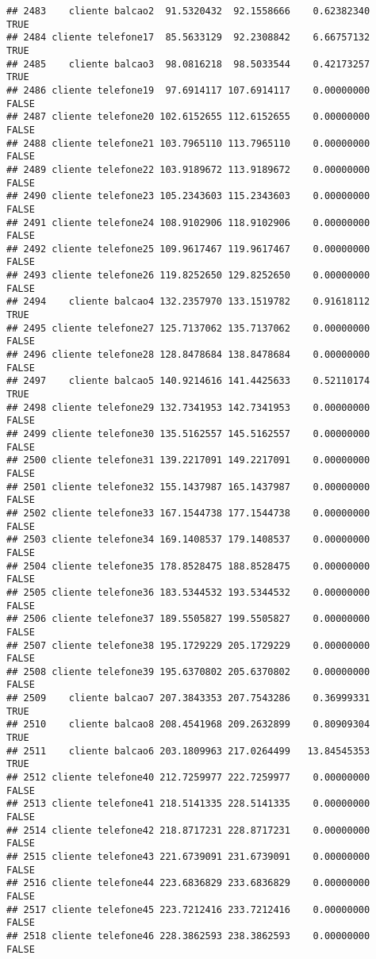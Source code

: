 \documentclass[
]{article}
\begin{document}
\begin{verbatim}
## 2483    cliente balcao2  91.5320432  92.1558666    0.62382340     TRUE
## 2484 cliente telefone17  85.5633129  92.2308842    6.66757132     TRUE
## 2485    cliente balcao3  98.0816218  98.5033544    0.42173257     TRUE
## 2486 cliente telefone19  97.6914117 107.6914117    0.00000000    FALSE
## 2487 cliente telefone20 102.6152655 112.6152655    0.00000000    FALSE
## 2488 cliente telefone21 103.7965110 113.7965110    0.00000000    FALSE
## 2489 cliente telefone22 103.9189672 113.9189672    0.00000000    FALSE
## 2490 cliente telefone23 105.2343603 115.2343603    0.00000000    FALSE
## 2491 cliente telefone24 108.9102906 118.9102906    0.00000000    FALSE
## 2492 cliente telefone25 109.9617467 119.9617467    0.00000000    FALSE
## 2493 cliente telefone26 119.8252650 129.8252650    0.00000000    FALSE
## 2494    cliente balcao4 132.2357970 133.1519782    0.91618112     TRUE
## 2495 cliente telefone27 125.7137062 135.7137062    0.00000000    FALSE
## 2496 cliente telefone28 128.8478684 138.8478684    0.00000000    FALSE
## 2497    cliente balcao5 140.9214616 141.4425633    0.52110174     TRUE
## 2498 cliente telefone29 132.7341953 142.7341953    0.00000000    FALSE
## 2499 cliente telefone30 135.5162557 145.5162557    0.00000000    FALSE
## 2500 cliente telefone31 139.2217091 149.2217091    0.00000000    FALSE
## 2501 cliente telefone32 155.1437987 165.1437987    0.00000000    FALSE
## 2502 cliente telefone33 167.1544738 177.1544738    0.00000000    FALSE
## 2503 cliente telefone34 169.1408537 179.1408537    0.00000000    FALSE
## 2504 cliente telefone35 178.8528475 188.8528475    0.00000000    FALSE
## 2505 cliente telefone36 183.5344532 193.5344532    0.00000000    FALSE
## 2506 cliente telefone37 189.5505827 199.5505827    0.00000000    FALSE
## 2507 cliente telefone38 195.1729229 205.1729229    0.00000000    FALSE
## 2508 cliente telefone39 195.6370802 205.6370802    0.00000000    FALSE
## 2509    cliente balcao7 207.3843353 207.7543286    0.36999331     TRUE
## 2510    cliente balcao8 208.4541968 209.2632899    0.80909304     TRUE
## 2511    cliente balcao6 203.1809963 217.0264499   13.84545353     TRUE
## 2512 cliente telefone40 212.7259977 222.7259977    0.00000000    FALSE
## 2513 cliente telefone41 218.5141335 228.5141335    0.00000000    FALSE
## 2514 cliente telefone42 218.8717231 228.8717231    0.00000000    FALSE
## 2515 cliente telefone43 221.6739091 231.6739091    0.00000000    FALSE
## 2516 cliente telefone44 223.6836829 233.6836829    0.00000000    FALSE
## 2517 cliente telefone45 223.7212416 233.7212416    0.00000000    FALSE
## 2518 cliente telefone46 228.3862593 238.3862593    0.00000000    FALSE

\end{verbatim}
\end{document}
